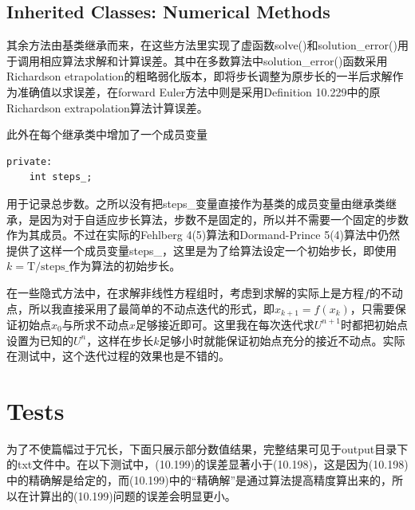 \documentclass[a4paper,11.5pt,UTF8]{ctexart}
\begin{document}
\begin{large}
\subsection{Inherited Classes: Numerical Methods}
\par 其余方法由基类继承而来，在这些方法里实现了虚函数solve()和solution\_error()用于调用相应算法求解和计算误差。其中在多数算法中solution\_error()函数采用Richardson etrapolation的粗略弱化版本，即将步长调整为原步长的一半后求解作为准确值以求误差，在forward Euler方法中则是采用Definition 10.229中的原Richardson extrapolation算法计算误差。 
\par 此外在每个继承类中增加了一个成员变量
\begin{lstlisting}
private:
    int steps_;
\end{lstlisting}
用于记录总步数。之所以没有把steps\_变量直接作为基类的成员变量由继承类继承，是因为对于自适应步长算法，步数不是固定的，所以并不需要一个固定的步数作为其成员。不过在实际的Fehlberg 4(5)算法和Dormand-Prince 5(4)算法中仍然提供了这样一个成员变量steps\_，这里是为了给算法设定一个初始步长，即使用$k=\text{T}/\text{steps\_}$作为算法的初始步长。
\par 在一些隐式方法中，在求解非线性方程组时，考虑到求解的实际上是方程$f$的不动点，所以我直接采用了最简单的不动点迭代的形式，即$x_{k+1}=f(x_k)$，只需要保证初始点$x_0$与所求不动点$x$足够接近即可。这里我在每次迭代求$U^{n+1}$时都把初始点设置为已知的$U^n$，这样在步长$k$足够小时就能保证初始点充分的接近不动点。实际在测试中，这个迭代过程的效果也是不错的。

\section{Tests}
\par 为了不使篇幅过于冗长，下面只展示部分数值结果，完整结果可见于output目录下的txt文件中。在以下测试中，(10.199)的误差显著小于(10.198)，这是因为(10.198)中的精确解是给定的，而(10.199)中的“精确解”是通过算法提高精度算出来的，所以在计算出的(10.199)问题的误差会明显更小。

\end{large}
\end{document}
